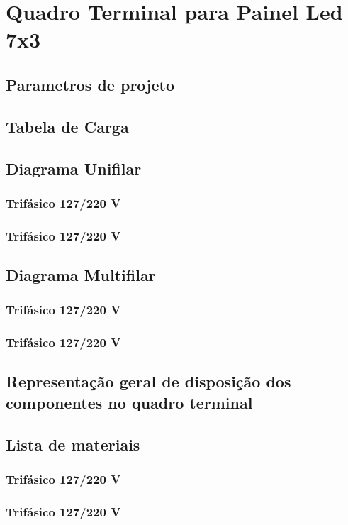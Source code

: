 \section{Quadro Terminal para Painel Led 7x3}
\subsection{Parametros de projeto}
\subsection{Tabela de Carga}
\subsection{Diagrama Unifilar}

\subsubsection{Trifásico 127/220 V}

\subsubsection{Trifásico 127/220 V}

\subsection{Diagrama Multifilar}

\subsubsection{Trifásico 127/220 V}

\subsubsection{Trifásico 127/220 V}

\subsection{Representação geral de disposição dos componentes no quadro terminal}

\subsection{Lista de materiais}

\subsubsection{Trifásico 127/220 V}

\subsubsection{Trifásico 127/220 V}
